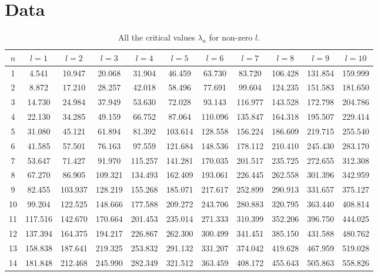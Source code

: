 \documentclass[12pt,twoside]{reedthesis}
\begin{document}
\chapter{Data}
\begin{table}[h]
\scriptsize
	\caption{All the critical values $\lambda_n$ for non-zero $l$.}
	\label{tab:alldata}
	\begin{tabular}{c|cccccccccc}
		$n$	& $l = 1$	& $l = 2$	& $l = 3$	& $l = 4$	& $l = 5$	& $l = 6$	& $l = 7$	& $l = 8$	& $l = 9$	& $l = 10$\\
		\hline
		1	& 4.541	& 10.947	& 20.068	& 31.904	& 46.459	& 63.730	& 83.720	& 106.428	& 131.854	& 159.999\\
		2	& 8.872	& 17.210	& 28.257	& 42.018	& 58.496	& 77.691	& 99.604	& 124.235	& 151.583	& 181.650\\
		3	& 14.730	& 24.984	& 37.949	& 53.630	& 72.028	& 93.143	& 116.977	& 143.528	& 172.798	& 204.786\\
		4	& 22.130	& 34.285	& 49.159	& 66.752	& 87.064	& 110.096	& 135.847	& 164.318	& 195.507	& 229.414\\
		5	& 31.080	& 45.121	& 61.894	& 81.392	& 103.614	& 128.558	& 156.224	& 186.609	& 219.715	& 255.540\\
		6	& 41.585	& 57.501	& 76.163	& 97.559	& 121.684	& 148.536	& 178.112	& 210.410	& 245.430	& 283.170\\
		7	& 53.647	& 71.427	& 91.970	& 115.257	& 141.281	& 170.035	& 201.517	& 235.725	& 272.655	& 312.308\\
		8	& 67.270	& 86.905	& 109.321	& 134.493	& 162.409	& 193.061	& 226.445	& 262.558	& 301.396	& 342.959\\
		9	& 82.455	& 103.937	& 128.219	& 155.268	& 185.071	& 217.617	& 252.899	& 290.913	& 331.657	& 375.127\\
		10	& 99.204	& 122.525	& 148.666	& 177.588	& 209.272	& 243.706	& 280.883	& 320.795	& 363.440	& 408.814\\
		11	& 117.516	& 142.670	& 170.664	& 201.453	& 235.014	& 271.333	& 310.399	& 352.206	& 396.750	& 444.025\\
		12	& 137.394	& 164.375	& 194.217	& 226.867	& 262.300	& 300.499	& 341.451	& 385.150	& 431.588	& 480.762\\
		13	& 158.838	& 187.641	& 219.325	& 253.832	& 291.132	& 331.207	& 374.042	& 419.628	& 467.959	& 519.028\\
		14	& 181.848	& 212.468	& 245.990	& 282.349	& 321.512	& 363.459	& 408.172	& 455.643	& 505.863	& 558.826\\

\end{tabular}
\end{table}
\end{document}
